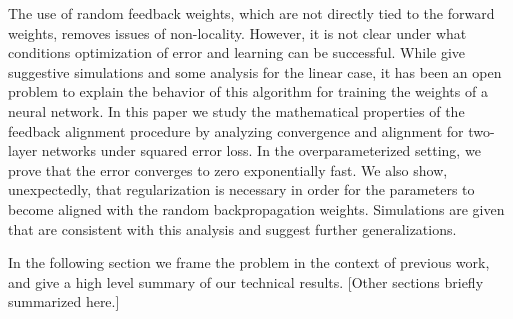 The use of random feedback weights, which are not directly tied to the forward weights, removes issues of non-locality. However, it is not clear under what conditions optimization of error and learning can be successful. While \citet{lillicrap2016random} give suggestive simulations and some analysis for the linear case, it has been an open problem to explain the behavior of this algorithm for training the weights of a neural network.
In this paper we study the mathematical properties of the feedback alignment procedure by analyzing convergence and alignment for two-layer networks under squared error loss. In the overparameterized setting, we prove that the error converges to zero exponentially fast. We also show, unexpectedly, that regularization is necessary in order for the  parameters to become aligned with the random backpropagation weights. Simulations are given that are consistent with this analysis and suggest further generalizations.

In the following section we frame the problem in the context of previous work, and give
a high level summary of our technical results. [Other sections briefly summarized here.]
